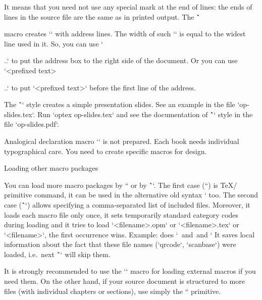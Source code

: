 {It means that you need not use any special mark at the end of lines: the ends
of lines in the source file are the same as in printed output. The
\^`\address` macro creates `\vtop` with address lines. The width of such
`\vtop` is equal to the widest line used in it. So, you can use
`\hfill\address...` to put the address box to the right side of the
document. Or you can use `<prefixed text>\address...` to put
`<prefixed text>` before the first line of the address.

The \^`\slides` style creates a simple presentation slides. See an example
in the file `op-slides.tex`. Run `optex op-slides.tex` and see the documentation of
\^`\slides` style in the file `op-slides.pdf`.

Analogical declaration macro `\book` is not prepared. Each book needs
individual typographical care. You need to create specific macros for
design.

\secc Loading other macro packages

You can load more macro packages by `` or by
\^``. The first case (``) is \TeX/ primitive command, it can be
used in the alternative old syntax ` too. The
second case (\^`\load`) allows specifying a comma-separated list of included files.
Moreover, it loads each macro file only once, it sets
temporarily standard category codes during loading and it tries to
load `<filename>.opm` or `<filename>.tex` or `<filename>`, the first occurrence
wins. Example:
\begtt
{}
\endtt
%
does ` \,and \,and `
It saves local information about the fact that these file names
(`qrcode`, `scanbase`) were loaded, i.e.\ next \^`\load` will skip them.

It is strongly recommended to use the `\load` macro for loading external
macros if you need them. On the other hand, if your source document is structured
to more files (with individual chapters or sections), use simply the `` primitive.

}
